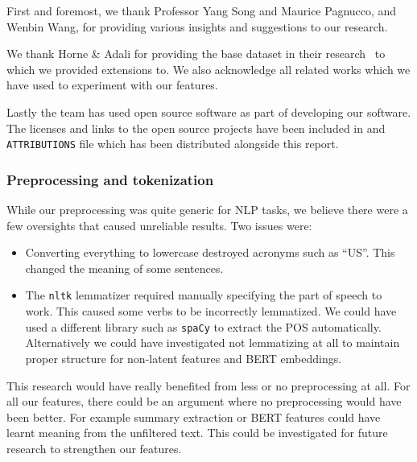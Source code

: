 \documentclass{article}
\begin{document}


First and foremost, we thank Professor Yang Song and Maurice Pagnucco, and Wenbin Wang, for providing various insights and suggestions to our research.

We thank Horne \& Adali for providing the base dataset in their research~\cite{horne2017} to which we provided extensions to. We also acknowledge all related works which we have used to experiment with our features.

Lastly the team has used open source software as part of developing our software. The licenses and links to the open source projects have been included in and \verb|ATTRIBUTIONS| file which has been distributed alongside this report.


\subsubsection*{Preprocessing and tokenization}\label{limitation:preprocessing}

While our preprocessing was quite generic for NLP tasks, we believe there were a few oversights that caused unreliable results. Two issues were:
\begin{itemize}
  \item Converting everything to lowercase destroyed acronyms such as ``US''. This changed the meaning of some sentences.
  \item The \verb|nltk| lemmatizer required manually specifying the part of speech to work. This caused some verbs to be incorrectly lemmatized. We could have used a different library such as \verb|spaCy| to extract the POS automatically. Alternatively we could have investigated not lemmatizing at all to maintain proper structure for non-latent features and BERT embeddings.
\end{itemize}

This research would have really benefited from less or no preprocessing at all. For all our features, there could be an argument where no preprocessing would have been better. For example summary extraction or BERT features could have learnt meaning from the unfiltered text. This could be investigated for future research to strengthen our features.
\end{document}
